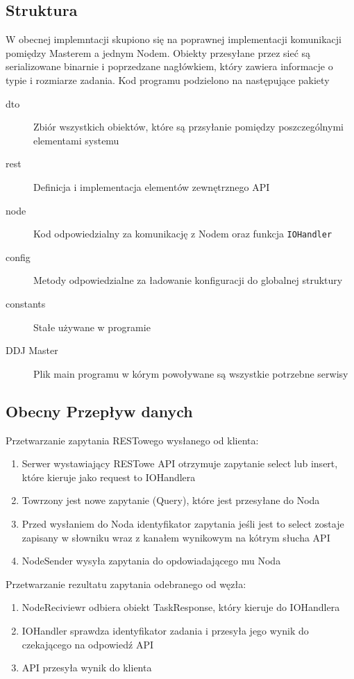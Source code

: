 \documentclass[paper=a4, fontsize=11pt]{scrartcl} %
\numberwithin{equation}{section} %
\numberwithin{figure}{section} %
\numberwithin{table}{section} %
\begin{document}
	\subsection{Struktura}
		W obecnej implemntacji skupiono się na poprawnej implementacji komunikacji pomiędzy Masterem a jednym Nodem.
		Obiekty przesyłane przez sieć są serializowane binarnie i poprzedzane nagłówkiem, który zawiera informacje
		o typie i rozmiarze zadania. Kod programu podzielono na następujące pakiety
		\begin{description}
			\item[dto] Zbiór wszystkich obiektów, które są przsyłanie pomiędzy poszczególnymi elementami systemu
			\item[rest] Definicja i implementacja elementów zewnętrznego API
			\item[node] Kod odpowiedzialny za komunikację z Nodem oraz funkcja \texttt{IOHandler}
			\item[config] Metody odpowiedzialne za ładowanie konfiguracji do globalnej struktury
			\item[constants] Stałe używane w programie
			\item[DDJ Master] Plik main programu w kórym powoływane są wszystkie potrzebne serwisy
		\end{description}

	\subsection{Obecny Przepływ danych}
		Przetwarzanie zapytania RESTowego wysłanego od klienta:
		\begin{enumerate}
			\item Serwer wystawiający RESTowe API otrzymuje zapytanie select lub insert, które kieruje jako request to IOHandlera
			\item Towrzony jest nowe zapytanie (Query), które jest przesyłane do Noda
			\item Przed wysłaniem do Noda identyfikator zapytania jeśli jest to select zostaje zapisany w słowniku wraz z kanałem 
			wynikowym na kótrym słucha API
			\item NodeSender wysyła zapytania do opdowiadającego mu Noda
		\end{enumerate}
		Przetwarzanie rezultatu zapytania odebranego od węzła:
		\begin{enumerate}
			\item NodeReciviewr odbiera obiekt TaskResponse, który kieruje do IOHandlera
			\item IOHandler sprawdza identyfikator zadania i przesyła jego wynik do czekającego na odpowiedź API
			\item API przesyła wynik do klienta
		\end{enumerate}
\end{document}
